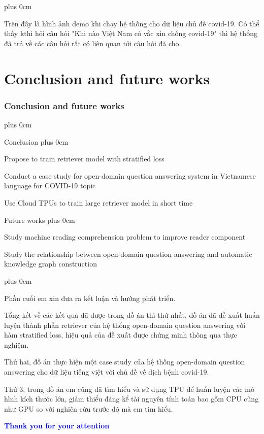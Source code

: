 \documentclass[11pt]{beamer}
\renewcommand{\raggedright}{\leftskip=0pt \rightskip=0pt plus 0cm}
\let\olditemize=\itemize
\renewenvironment{itemize}{\olditemize\raggedright}{\endlist}
\begin{document}
\begin{frame}
\begin{itemize}
	\item Trên đây là hình ảnh demo khi chạy hệ thống cho dữ liệu chủ đề covid-19. Có thể thấy kthi hỏi câu hỏi "Khi nào Việt Nam có vắc xin chống covid-19" thì hệ thống đã trả về các câu hỏi rất có liên quan tới câu hỏi đã cho.
\end{itemize}
\end{frame}
\section{Conclusion and future works}
\begin{frame}
	\frametitle{Conclusion and future works}
	\begin{center}
		\begin{itemize}
			\item Conclusion
			\begin{itemize}
				\item Propose to train retriever model with stratified loss
				\item Conduct a case study for open-domain question answering system in Vietnamese language for COVID-19 topic
				\item Use Cloud TPUs to train large retriever model in short time
			\end{itemize}
			\item Future works
			\begin{itemize}
				\item Study machine reading comprehension problem to improve reader component
				\item Study the relationship between open-domain question answering and automatic knowledge graph construction
			\end{itemize}
		\end{itemize}
	\end{center}
\end{frame}
\begin{frame}
\begin{itemize}
	\item Phần cuối em xin đưa ra kết luận và hướng phát triển.
	\item Tổng kết về các kết quả đã được trong đồ án thì thứ nhất, đồ án đã đề xuất huấn luyện thành phần retriever của hệ thống open-domain question answering với hàm stratified loss, hiệu quả của đề xuất được chứng minh thông qua thực nghiệm.
	\item Thứ hai, đồ án thực hiện một case study của hệ thống open-domain question answering cho dữ liệu tiếng việt với chủ đề về dịch bệnh covid-19.
	\item Thứ 3, trong đồ án em cũng đã tìm hiểu và sử dụng TPU để huấn luyện các mô hình kích thước lớn, giảm thiểu đáng kể tài nguyên tính toán bao gồm CPU cũng như GPU so với nghiên cứu trước đó mà em tìm hiểu.
\end{itemize}
\end{frame}
\begin{frame}[plain]
	\begin{center}
		\textcolor{blue}{\fontsize{20pt}{\baselineskip}\selectfont\bfseries Thank you for your attention}
	\end{center}
\end{frame}
\end{document}
